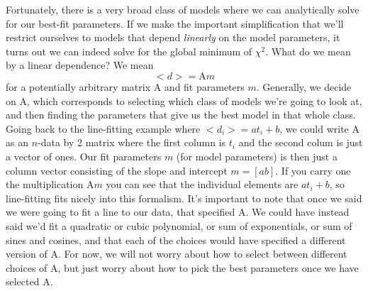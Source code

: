 \documentclass[letterpaper,11pt,preprint]{aastex}
\begin{document}
{Fortunately, there is a very broad class of models where we can
analytically solve for our best-fit parameters.  If we make the
important simplification that we'll restrict ourselves to models that
depend \textit{linearly} on the model parameters, it turns out we can
indeed solve for the global minimum of $\chi^2$.  What do we mean by a
linear dependence?  We mean
\begin{equation} \label{eq:llsmean}<d>=\mathrm{A}m\end{equation}
for a potentially arbitrary matrix $\mathrm{A}$ and fit parameters
$m$.  Generally, we decide on $\mathrm{A}$, which corresponds to
selecting which class of models we're going to look at, and then
finding the parameters that give us the best model in that whole
class.  Going back to the line-fitting example where $<d_i>=at_i+b$,
we could write $\mathrm{A}$ as an $n$-data by 2 matrix where the first
column is $t_i$ and the second colum is just a vector of ones.  Our
fit parameters $m$ (for model parameters) is then just a column vector consisting of the slope and
intercept $m=[a b]$.  If you carry one the multiplication
$\mathrm{A}m$ you can see that the individual elements are $at_i+b$,
so line-fitting fits nicely into this formalism.  It's important to
note that once we said we were going to fit a line to our data, that
specified $\mathrm{A}$.  We could have instead said we'd fit a
quadratic or cubic polynomial, or sum of exponentials, or sum of sines
and cosines, and that each of the choices would have specified a
different version of $\mathrm{A}$.  For now, we will not worry about
how to select between different choices of $\mathrm{A}$, but just
worry about how to pick the best parameters once we have selected
$\mathrm{A}$.  

}
\end{document}
